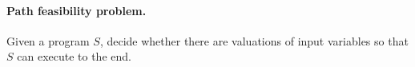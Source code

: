 \paragraph*{Path feasibility problem.} Given a {\slint} program $S$, decide whether there are valuations of input variables so that $S$ can execute to the end.

%

















